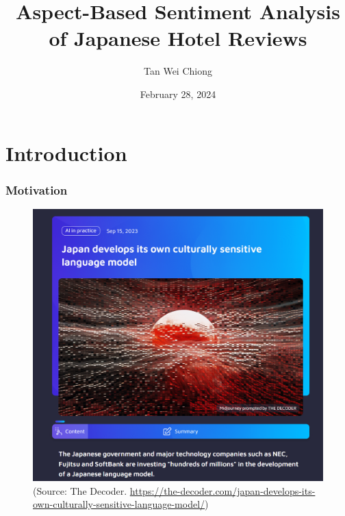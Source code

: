 \documentclass[11pt]{beamer}
\title{Aspect-Based Sentiment Analysis of Japanese Hotel Reviews}
\author{Tan Wei Chiong}
\date{February 28, 2024}
\begin{document}
	\begin{frame}[plain]
		\maketitle
	\end{frame}
	
	\begin{frame}[plain]
		\tableofcontents
	\end{frame}
	
	\section{Introduction}
	
	\begin{frame}
		\frametitle{Motivation}
		\begin{figure}
			\begin{center}
				\includegraphics[scale=0.25]{japanese_llm}
			\end{center}
			\caption{(Source: The Decoder. \url{https://the-decoder.com/japan-develops-its-own-culturally-sensitive-language-model/})}
		\end{figure}
	\end{frame}
	
\end{document}
